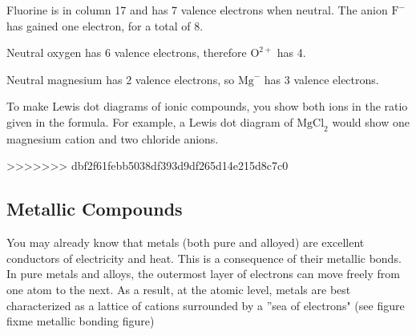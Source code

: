 Fluorine is in column 17 and has 7 valence electrons when neutral. The anion 
$\text{F}^-$ has gained one electron, for a total of 8. 

\begin{center}
\end{center}

Neutral oxygen has 6 valence electrons, therefore $\text{O}^{2+}$ has 4. 
\begin{center}
\end{center}

Neutral magnesium has 2 valence electrons, so $\text{Mg}^{-}$ has 3 valence 
electrons. 
\begin{center}
\end{center}

To make Lewis dot diagrams of ionic compounds, you show both ions in the ratio 
given in the formula. For example, a Lewis dot diagram of $\text{MgCl}_2$ would 
show one magnesium cation and two chloride anions. 

>>>>>>> dbf2f61febb5038df393d9df265d14e215d8c7c0
\subsection{Metallic Compounds}
You may already know that metals (both pure and alloyed) are excellent conductors 
of electricity and heat. This is a consequence of their metallic bonds. In pure 
metals and alloys, the outermost layer of electrons can move freely from one atom 
to the next. As a result, at the atomic level, metals are best characterized as a 
lattice of cations surrounded by a ''sea of electrons" (see figure	fixme metallic bonding figure)

